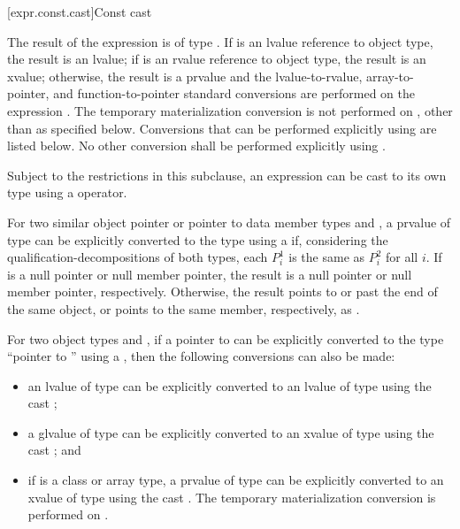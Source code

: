 [expr.const.cast]{Const cast}

\pnum
{}%
%
The result of the expression  is of type
. If  is an lvalue reference to object type, the result is an
lvalue;
if  is an rvalue reference to object type, the result is an xvalue;
otherwise, the result is a prvalue and the
lvalue-to-rvalue, array-to-pointer,
and function-to-pointer standard conversions are
performed on the expression .
The temporary materialization conversion is not
performed on , other than as specified below.
Conversions that can be performed explicitly using
 are listed below. No other conversion shall be
performed explicitly using .

\pnum
\begin{note}
Subject to the restrictions in this subclause, an expression can be cast
to its own type using a  operator.
\end{note}

\pnum
For two similar object pointer or pointer to data member types
 and ,
a prvalue of type  can be explicitly
converted to the type  using a 
if, considering the qualification-decompositions of both types,
each $P^1_i$ is the same as $P^2_i$ for all $i$.
If  is a null pointer or null member pointer,
the result is a null pointer or null member pointer, respectively.
Otherwise, the result points to or past the end of the same object, or
points to the same member, respectively, as .

\pnum
For two object types  and , if a pointer to  can
be explicitly converted to the type ``pointer to '' using a
, then the following conversions can also be made:
\begin{itemize}
\item an lvalue of type  can be explicitly converted to an lvalue
of type  using the cast ;

\item a glvalue of type  can be explicitly converted to an xvalue
of type  using the cast ; and

\item if  is a class or array type,
a prvalue of type  can be
explicitly converted to an xvalue of type  using the cast
.
The temporary materialization conversion is performed on .
\end{itemize}

